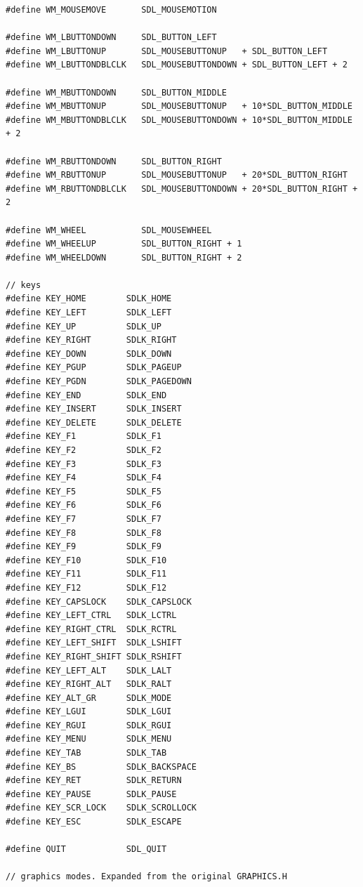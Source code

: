 \documentclass[a4paper,12pt]{article}
\begin{document}
\begin{small}
\begin{spacing}{0.85}
\begin{verbatim}
#define WM_MOUSEMOVE       SDL_MOUSEMOTION

#define WM_LBUTTONDOWN     SDL_BUTTON_LEFT
#define WM_LBUTTONUP       SDL_MOUSEBUTTONUP   + SDL_BUTTON_LEFT
#define WM_LBUTTONDBLCLK   SDL_MOUSEBUTTONDOWN + SDL_BUTTON_LEFT + 2

#define WM_MBUTTONDOWN     SDL_BUTTON_MIDDLE
#define WM_MBUTTONUP       SDL_MOUSEBUTTONUP   + 10*SDL_BUTTON_MIDDLE
#define WM_MBUTTONDBLCLK   SDL_MOUSEBUTTONDOWN + 10*SDL_BUTTON_MIDDLE + 2

#define WM_RBUTTONDOWN     SDL_BUTTON_RIGHT
#define WM_RBUTTONUP       SDL_MOUSEBUTTONUP   + 20*SDL_BUTTON_RIGHT
#define WM_RBUTTONDBLCLK   SDL_MOUSEBUTTONDOWN + 20*SDL_BUTTON_RIGHT + 2

#define WM_WHEEL           SDL_MOUSEWHEEL
#define WM_WHEELUP         SDL_BUTTON_RIGHT + 1
#define WM_WHEELDOWN       SDL_BUTTON_RIGHT + 2

// keys
#define KEY_HOME        SDLK_HOME
#define KEY_LEFT        SDLK_LEFT
#define KEY_UP          SDLK_UP
#define KEY_RIGHT       SDLK_RIGHT
#define KEY_DOWN        SDLK_DOWN
#define KEY_PGUP        SDLK_PAGEUP
#define KEY_PGDN        SDLK_PAGEDOWN
#define KEY_END         SDLK_END
#define KEY_INSERT      SDLK_INSERT
#define KEY_DELETE      SDLK_DELETE
#define KEY_F1          SDLK_F1
#define KEY_F2          SDLK_F2
#define KEY_F3          SDLK_F3
#define KEY_F4          SDLK_F4
#define KEY_F5          SDLK_F5
#define KEY_F6          SDLK_F6
#define KEY_F7          SDLK_F7
#define KEY_F8          SDLK_F8
#define KEY_F9          SDLK_F9
#define KEY_F10         SDLK_F10
#define KEY_F11         SDLK_F11
#define KEY_F12         SDLK_F12
#define KEY_CAPSLOCK    SDLK_CAPSLOCK
#define KEY_LEFT_CTRL   SDLK_LCTRL
#define KEY_RIGHT_CTRL  SDLK_RCTRL
#define KEY_LEFT_SHIFT  SDLK_LSHIFT
#define KEY_RIGHT_SHIFT SDLK_RSHIFT
#define KEY_LEFT_ALT    SDLK_LALT
#define KEY_RIGHT_ALT   SDLK_RALT
#define KEY_ALT_GR      SDLK_MODE
#define KEY_LGUI        SDLK_LGUI
#define KEY_RGUI        SDLK_RGUI
#define KEY_MENU        SDLK_MENU
#define KEY_TAB         SDLK_TAB
#define KEY_BS          SDLK_BACKSPACE
#define KEY_RET         SDLK_RETURN
#define KEY_PAUSE       SDLK_PAUSE
#define KEY_SCR_LOCK    SDLK_SCROLLOCK
#define KEY_ESC         SDLK_ESCAPE

#define QUIT            SDL_QUIT

// graphics modes. Expanded from the original GRAPHICS.H


\end{verbatim}
\end{spacing}
\end{small}
\end{document}
